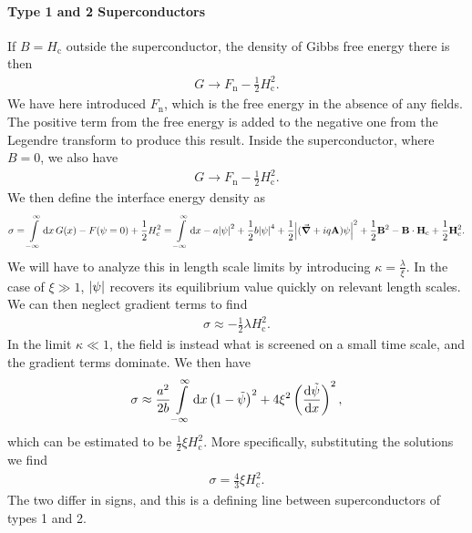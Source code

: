 \paragraph{Type 1 and 2 Superconductors}
If $B = H_{\text{c}}$ outside the superconductor, the density of Gibbs free energy there is then
\begin{align*}
	G \to F_{\text{n}} - \frac{1}{2}H_{\text{c}}^{2}.
\end{align*}
We have here introduced $F_{\text{n}}$, which is the free energy in the absence of any fields. The positive term from the free energy is added to the negative one from the Legendre transform to produce this result. Inside the superconductor, where $B = 0$, we also have
\begin{align*}
	G \to F_{\text{n}} - \frac{1}{2}H_{\text{c}}^{2}.
\end{align*}
We then define the interface energy density as
\begin{align*}
	\sigma = \int\limits_{-\infty}^{\infty}\dd{x}G(x) - F(\psi = 0) + \frac{1}{2}H_{\text{c}}^{2} = \int\limits_{-\infty}^{\infty}\dd{x}-a\abs{\psi}^{2} + \frac{1}{2}b\abs{\psi}^{4} + \frac{1}{2}\abs{(\grad{} + iq\vb{A})\psi}^{2} + \frac{1}{2}\vb{B}^{2} - \vb{B}\cdot\vb{H}_{\text{c}} + \frac{1}{2}\vb{H}_{\text{c}}^{2}.
\end{align*}
We will have to analyze this in length scale limits by introducing $\kappa = \frac{\lambda}{\xi}$. In the case of $\xi \gg 1$, $\abs{\psi}$ recovers its equilibrium value quickly on relevant length scales. We can then neglect gradient terms to find
\begin{align*}
	\sigma \approx -\frac{1}{2}\lambda H_{\text{c}}^{2}.
\end{align*}
In the limit $\kappa \ll 1$, the field is instead what is screened on a small time scale, and the gradient terms dominate. We then have
\begin{align*}
	\sigma \approx \frac{a^{2}}{2b}\int\limits_{-\infty}^{\infty}\dd{x}\left(1 - \tilde{\psi}\right)^{2} + 4\xi^{2}\left(\dv{\tilde{\psi}}{x}\right)^{2},
\end{align*}
which can be estimated to be $\frac{1}{2}\xi H_{\text{c}}^{2}$. More specifically, substituting the solutions we find
\begin{align*}
	\sigma = \frac{4}{3}\xi H_{\text{c}}^{2}.
\end{align*}
The two differ in signs, and this is a defining line between superconductors of types 1 and 2.

